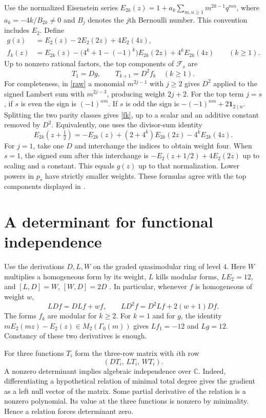 \documentclass[11pt]{article}
\newcommand{\CC}{\mathbb C}
\newcommand{\F}{\mathcal F}
\begin{document}
Use the normalized Eisenstein series $E_{2k}(z)=1+a_k\sum_{m,n\ge1}m^{2k-1}q^{mn}$, where $a_k=-4k/B_{2k}\ne0$ and $B_j$ denotes the $j$th Bernoulli number. This convention includes $E_2$. Define
\begin{align}
 g(z)&=E_2(z)-2E_2(2z)+4E_2(4z),\nonumber\\
 f_k(z)&=E_{2k}(z)-\bigl(4^k+1-(-1)^k\bigr)E_{2k}(2z)
          +4^k E_{2k}(4z) \qquad(k\ge1).\label{fk}
\end{align}
Up to nonzero rational factors, the top components of $\F_s$ are
\begin{equation}\label{top}
 T_1=Dg,\qquad T_{k+1}=D^2 f_k\quad(k\ge1).
\end{equation}
For completeness, in \eqref{raw} a monomial $m^{2j-1}$ with $j\ge2$ gives $D^2$ applied to the signed Lambert sum with $m^{2j-3}$, producing weight $2j+2$. For the top term $j=s$, if $s$ is even the sign is $(-1)^{nm}$. If $s$ is odd the sign is $-(-1)^{nm}+2\boldsymbol{1}_{2\mid n}$. Splitting the two parity classes gives \eqref{fk}, up to a scalar and an additive constant removed by $D^2$. Equivalently, one uses the divisor-sum identity
\[
 E_{2k}(z+\tfrac12)=-E_{2k}(z)+(2+4^k)E_{2k}(2z)-4^kE_{2k}(4z).
\]
For $j=1$, take one $D$ and interchange the indices to obtain weight four. When $s=1$, the signed sum after this interchange is $-E_2(z+1/2)+4E_2(2z)$ up to scaling and a constant. This equals $g(z)$ up to that normalization. Lower powers in $p_s$ have strictly smaller weights. These formulas agree with the top components displayed in \cite[Proposition 5.10]{Wang2025}.

\clearpage
\section{A determinant for functional independence}
Use the derivations $D,L,W$ on the graded quasimodular ring of level $4$. Here $W$ multiplies a homogeneous form by its weight, $L$ kills modular forms, $LE_2=12$, and $[L,D]=W$, $[W,D]=2D$ \cite[Section 8]{NSZ}. In particular, whenever $f$ is homogeneous of weight $w$,
\[
 LDf=D Lf+wf,\qquad LD^2f=D^2 Lf+2(w+1)Df.
\]
The forms $f_k$ are modular for $k\ge2$. For $k=1$ and for $g$, the identity $mE_2(mz)-E_2(z)\in M_2(\Gamma_0(m))$ gives $Lf_1=-12$ and $Lg=12$. Constancy of these two derivatives is enough.

For three functions $T_i$ form the three-row matrix with $i$th row
\[
 (D T_i,\, L T_i,\, W T_i).
\]
A nonzero determinant implies algebraic independence over $\CC$. Indeed, differentiating a hypothetical relation of minimal total degree gives the gradient as a left null vector of the matrix. Some partial derivative of the relation is a nonzero polynomial. Its value at the three functions is nonzero by minimality. Hence a relation forces determinant zero.
\end{document}
